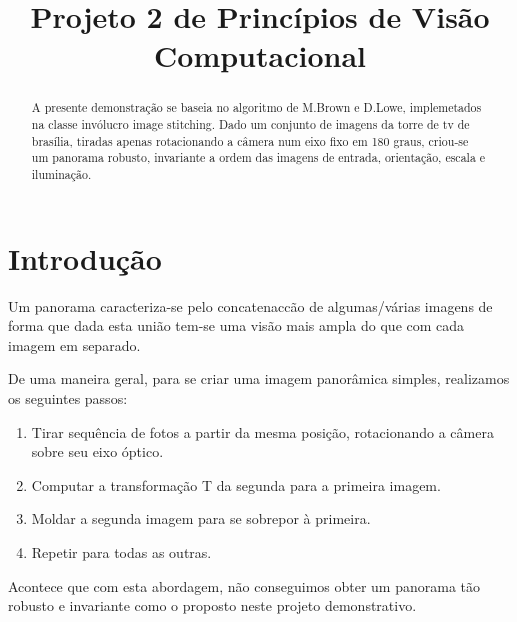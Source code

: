 \documentclass[conference]{IEEEtran}
\begin{document}
\title{Projeto 2 de Princ\'ipios de Vis\~ao Computacional}
\author{
}
\maketitle
\begin{abstract}
A presente demonstra\c{c}\~ao se baseia no algoritmo de M.Brown e D.Lowe, implemetados na classe inv\'olucro image stitching.
Dado um conjunto de imagens da torre de tv de bras\'ilia, tiradas apenas rotacionando a c\^amera num eixo fixo em 
180 graus, criou-se um panorama robusto, invariante a ordem das imagens de entrada, orienta\c{c}\~ao, escala e ilumina\c{c}\~ao.
\end{abstract}

\section{ Introdu\c{c}\~ao} 
\label{sec:meth} 
	Um panorama caracteriza-se pelo concatenac{c}\~ao de algumas/v\'arias imagens de forma que dada esta uni\~ao tem-se
	uma vis\~ao mais ampla do que com cada imagem em separado.
	
	De uma maneira geral, para se criar uma imagem panor\^amica simples, realizamos os seguintes passos:
	\\
\begin{enumerate}
	\item Tirar sequ\^encia de fotos a partir da mesma posi\c{c}\~ao, rotacionando a c\^amera sobre seu eixo \'optico.
	\item Computar a transforma\c{c}\~ao T da segunda para a primeira imagem.
	\item Moldar a segunda imagem para se sobrepor \`a primeira.
	\item Repetir para todas as outras.
\end{enumerate}

Acontece que com esta abordagem, n\~ao conseguimos obter um panorama t\~ao robusto e invariante como o proposto
neste projeto demonstrativo.
\end{document}
